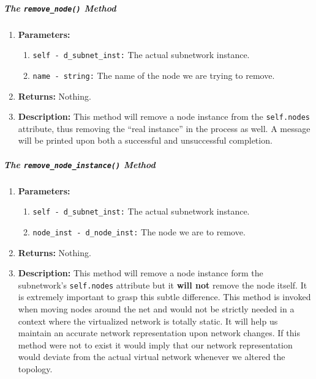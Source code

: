                     \subparagraph{The \texttt{remove\_node()} Method}
                        \begin{enumerate}
                            \item \textbf{Parameters:}
                            \begin{enumerate}
                                \item \texttt{self - d\_subnet\_inst:} The actual subnetwork instance.
                                \item \texttt{name - string:} The name of the node we are trying to remove.
                            \end{enumerate}
                            \item \textbf{Returns:} Nothing.
                            \item \textbf{Description:} This method will remove a node instance from the \texttt{self.nodes} attribute, thus removing the ``real instance'' in the process as well. A message will be printed upon both a successful and unsuccessful completion.
                        \end{enumerate}

                    \subparagraph{The \texttt{remove\_node\_instance()} Method}
                        \begin{enumerate}
                            \item \textbf{Parameters:}
                            \begin{enumerate}
                                \item \texttt{self - d\_subnet\_inst:} The actual subnetwork instance.
                                \item \texttt{node\_inst - d\_node\_inst:} The node we are to remove.
                            \end{enumerate}
                            \item \textbf{Returns:} Nothing.
                            \item \textbf{Description:} This method will remove a node instance form the subnetwork's \texttt{self.nodes} attribute but it \textbf{will not} remove the node itself. It is extremely important to grasp this subtle difference. This method is invoked when moving nodes around the net and would not be strictly needed in a context where the virtualized network is totally static. It will help us maintain an accurate network representation upon network changes. If this method were not to exist it would imply that our network representation would deviate from the actual virtual network whenever we altered the topology.
                        \end{enumerate}


